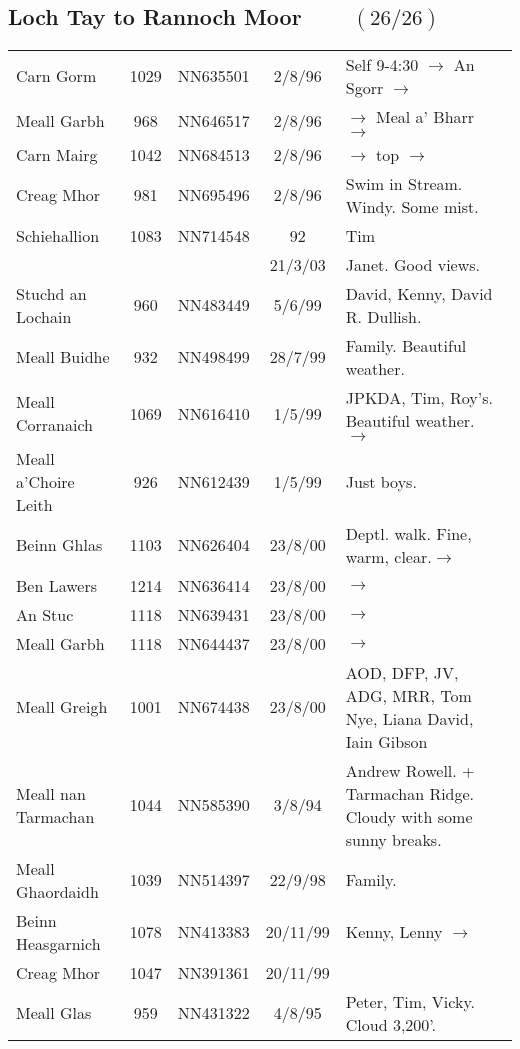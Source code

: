 \documentclass[10pt,a4paper]{article}
\begin{document}
\newpage

\subsection*{Loch Tay to Rannoch Moor $\qquad (26/26)$}

\begin{tabular}{lcccp{6cm}}
Carn Gorm  & 1029  & NN635501&2/8/96&Self 9-4:30 $\rightarrow$ An Sgorr $\rightarrow$  \\
Meall Garbh & 968  & NN646517 &2/8/96&$\rightarrow$ Meal a' Bharr $\rightarrow$ \\
Carn Mairg & 1042  & NN684513 &2/8/96&$\rightarrow$ top $\rightarrow$ \\
Creag Mhor & 981  & NN695496 &2/8/96& Swim in Stream. Windy. Some mist.\\
Schiehallion  & 1083  & NN714548 &92&Tim   \\
&&&21/3/03&Janet. Good views.\\
Stuchd an Lochain & 960 & NN483449 &5/6/99& David, Kenny, David R. Dullish.\\
Meall Buidhe & 932 & NN498499 &28/7/99& Family. Beautiful weather.\\
Meall Corranaich  & 1069 & NN616410 &1/5/99& JPKDA, Tim, Roy's.
Beautiful weather. $\rightarrow$ \\
Meall a'Choire Leith & 926 & NN612439 &1/5/99& Just boys.\\
Beinn Ghlas  & 1103 & NN626404 &23/8/00& Deptl. walk. Fine, warm, clear.$\rightarrow$\\
Ben Lawers  & 1214  & NN636414 &23/8/00& $\rightarrow$ \\
An Stuc & 1118 & NN639431 &23/8/00& $\rightarrow$ \\
Meall Garbh & 1118 & NN644437 &23/8/00& $\rightarrow$\\
Meall Greigh  & 1001 & NN674438 &23/8/00& AOD, DFP, JV, ADG, MRR, Tom Nye, Liana David, Iain Gibson\\
Meall nan Tarmachan  & 1044  & NN585390&3/8/94&Andrew Rowell. +
Tarmachan Ridge. Cloudy with some
sunny breaks. \\
Meall Ghaordaidh  & 1039 & NN514397 &22/9/98& Family.\\
Beinn Heasgarnich  & 1078  & NN413383 &20/11/99&Kenny, Lenny $\rightarrow$\\
Creag Mhor & 1047 & NN391361 &20/11/99& \\
Meall Glas & 959 & NN431322&4/8/95&Peter, Tim, Vicky. Cloud 3,200'.  \\

\end{tabular}
\end{document}
